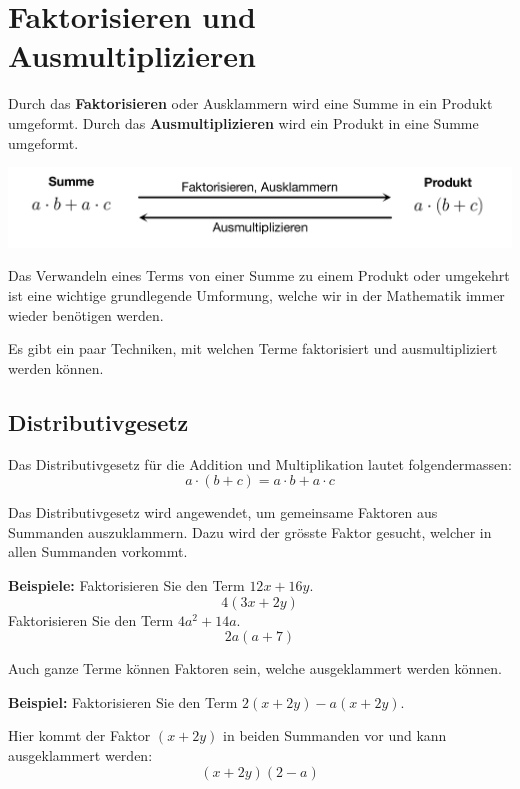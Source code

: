 \newpage
\section{Faktorisieren und Ausmultiplizieren}
Durch das \textbf{Faktorisieren} oder Ausklammern wird eine Summe in ein Produkt umgeformt. Durch das \textbf{Ausmultiplizieren} wird ein Produkt in eine Summe umgeformt.

\begin{center}
  \includegraphics[width=.8\textwidth]{Faktorisieren.pdf}
\end{center}

Das Verwandeln eines Terms von einer Summe zu einem Produkt oder umgekehrt ist eine wichtige grundlegende Umformung, welche wir in der Mathematik immer wieder benötigen werden.

Es gibt ein paar Techniken, mit welchen Terme faktorisiert und ausmultipliziert werden können.

\subsection{Distributivgesetz}

Das Distributivgesetz für die Addition und Multiplikation lautet folgendermassen:
\[
  a\cdot(b+c) = a\cdot b + a\cdot c
\]

Das Distributivgesetz wird angewendet, um gemeinsame Faktoren aus Summanden auszuklammern. Dazu wird der grösste Faktor gesucht, welcher in allen Summanden vorkommt.

\begin{example}
  \textbf{Beispiele:} Faktorisieren Sie den Term $12x+16y$.
  \[
    4(3x+2y)
  \]
  Faktorisieren Sie den Term $4a^{2}+14a$.
  \[
    2a(a+7)
  \]
\end{example}

Auch ganze Terme können Faktoren sein, welche ausgeklammert werden können.

\begin{example}
  \textbf{Beispiel:} Faktorisieren Sie den Term $2(x+2y)-a(x+2y)$.

  Hier kommt der Faktor $(x+2y)$ in beiden Summanden vor und kann ausgeklammert werden:
  \[
    (x+2y)(2-a)
  \]
\end{example}

